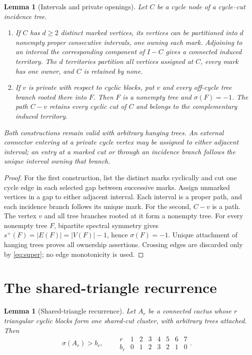 \documentclass[11pt]{article}
\newtheorem{lemma}[theorem]{Lemma}
\newcommand{\spE}{s^+}
\newcommand{\sig}{\sigma}
\begin{document}
\begin{lemma}[Intervals and private openings]\label{lem:intervals}
Let $C$ be a cycle node of a cycle--cut incidence tree.
\begin{enumerate}
\item If $C$ has $d\geq2$ distinct marked vertices, its vertices can be
partitioned into $d$ nonempty proper consecutive intervals, one owning each
mark.  Adjoining to an interval the corresponding component of $I-C$ gives a
connected induced territory.  The $d$ territories partition all vertices
assigned at $C$, every mark has one owner, and $C$ is retained by none.
\item If $v$ is private with respect to cyclic blocks, put $v$ and every
off-cycle tree branch rooted there into $F$.  Then $F$ is a nonempty tree and
$\sig(F)=-1$.  The path $C-v$ retains every cyclic cut of $C$ and belongs to
the complementary induced territory.
\end{enumerate}
Both constructions remain valid with arbitrary hanging trees.  An external
connector entering at a private cycle vertex may be assigned to either adjacent
interval; an entry at a marked cut or through an incidence branch follows the
unique interval owning that branch.
\end{lemma}

\begin{proof}
For the first construction, list the distinct marks cyclically and cut one
cycle edge in each selected gap between successive marks.  Assign unmarked
vertices in a gap to either adjacent interval.  Each interval is a proper path,
and each incidence branch follows its unique mark.  For the second, $C-v$ is a
path.  The vertex $v$ and all tree branches rooted at it form a nonempty tree.
For every nonempty tree $F$, bipartite spectral symmetry gives
$\spE(F)=|E(F)|=|V(F)|-1$, hence $\sig(F)=-1$.  Unique attachment of hanging
trees proves all ownership assertions.  Crossing edges are discarded only by
\eqref{eq:super}; no edge monotonicity is used.
\end{proof}

\section{The shared-triangle recurrence}

\begin{lemma}[Shared-triangle recurrence]\label{lem:triangle-recurrence}
Let $A_r$ be a connected cactus whose $r$ triangular cyclic blocks form one
shared-cut cluster, with arbitrary trees attached.  Then
\begin{equation}\label{eq:br}
 \sig(A_r)>b_r,
 \qquad
 \begin{array}{c|rrrrrrr}
 r&1&2&3&4&5&6&7\\ \hline
 b_r&0&1&2&3&2&1&0
 \end{array}.
\end{equation}
\end{lemma}
\end{document}
